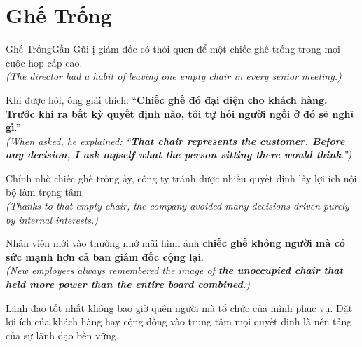 \section{Ghế Trống}
\begin{truyen}{Ghế Trống}{Gần Gũi}
ị giám đốc có thói quen để một chiếc ghế trống trong mọi cuộc họp cấp cao.\\
\textit{(The director had a habit of leaving one empty chair in every senior meeting.)}

Khi được hỏi, ông giải thích: ``\textbf{Chiếc ghế đó đại diện cho khách hàng. Trước khi ra bất kỳ quyết định nào, tôi tự hỏi người ngồi ở đó sẽ nghĩ gì}.''\\
\textit{(When asked, he explained: ``\textbf{That chair represents the customer. Before any decision, I ask myself what the person sitting there would think}.'')}

Chính nhờ chiếc ghế trống ấy, công ty tránh được nhiều quyết định lấy lợi ích nội bộ làm trọng tâm.\\
\textit{(Thanks to that empty chair, the company avoided many decisions driven purely by internal interests.)}

Nhân viên mới vào thường nhớ mãi hình ảnh \textbf{chiếc ghế không người mà có sức mạnh hơn cả ban giám đốc cộng lại}.\\
\textit{(New employees always remembered the image of \textbf{the unoccupied chair that held more power than the entire board combined}.)}
\end{truyen}
\begin{baihoc}
  Lãnh đạo tốt nhất không bao giờ quên người mà tổ chức của mình phục vụ. Đặt lợi ích của khách hàng hay cộng đồng vào trung tâm mọi quyết định là nền tảng của sự lãnh đạo bền vững.
\end{baihoc}

